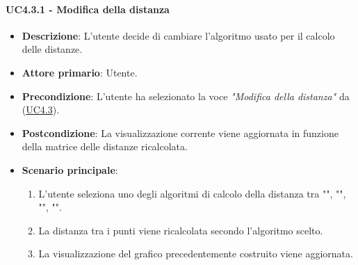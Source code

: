 \paragraph{UC4.3.1 - Modifica della distanza}
\label{par:uc4.3.1}
\begin{itemize}
    \item \textbf{Descrizione}: L’utente decide di cambiare l’algoritmo usato per il calcolo delle distanze.

    \item \textbf{Attore primario}: Utente.

    \item \textbf{Precondizione}:   L'utente ha selezionato la voce \emph{"Modifica della distanza"} da (\hyperref[ssub:uc4.3]{UC4.3}).
    \item \textbf{Postcondizione}:  La visualizzazione corrente viene aggiornata in funzione della matrice delle distanze ricalcolata.

	\item \textbf{Scenario principale}:
        \begin{enumerate}
            \item L'utente seleziona uno degli algoritmi di calcolo della distanza tra "", "", "", "".
            \item La distanza tra i punti viene ricalcolata secondo l'algoritmo scelto.
            \item La visualizzazione del grafico precedentemente costruito viene aggiornata.
        \end{enumerate}
\end{itemize}


